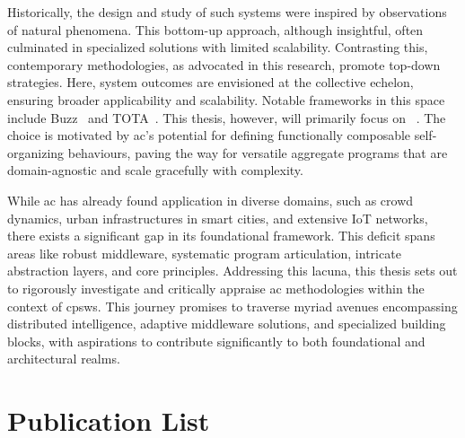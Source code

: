 Historically, the design and study of such systems were inspired by observations of natural phenomena. 
 This bottom-up approach, although insightful, often culminated in specialized solutions with limited scalability. 
 Contrasting this, contemporary methodologies, as advocated in this research, promote top-down strategies. 
 Here, system outcomes are envisioned at the collective echelon, ensuring broader applicability and scalability. 
 Notable frameworks in this space include Buzz~\cite{DBLP:journals/software/PinciroliB16} and TOTA~\cite{DBLP:conf/icdcsw/MameiZL03}. 
%
This thesis, however, will primarily focus on ~\cite{DBLP:journals/computer/BealPV15}. 
 The choice is motivated by \ac{ac}'s potential for defining functionally composable self-organizing behaviours, 
 paving the way for versatile aggregate programs that are domain-agnostic and scale gracefully with complexity.

While \ac{ac} has already found application in diverse domains, 
 such as crowd dynamics, urban infrastructures in smart cities, and extensive IoT networks, 
 there exists a significant gap in its foundational framework. 
%
This deficit spans areas like robust middleware, systematic program articulation, intricate abstraction layers, and core principles.
%
Addressing this lacuna, this thesis sets out to rigorously investigate and critically appraise \ac{ac} methodologies within the context of \acp{cpsw}. 
%
This journey promises to traverse myriad avenues encompassing distributed intelligence, adaptive middleware solutions, and specialized building blocks, with aspirations to contribute significantly to both foundational and architectural realms.

\section{Publication List}

\printbibliography
